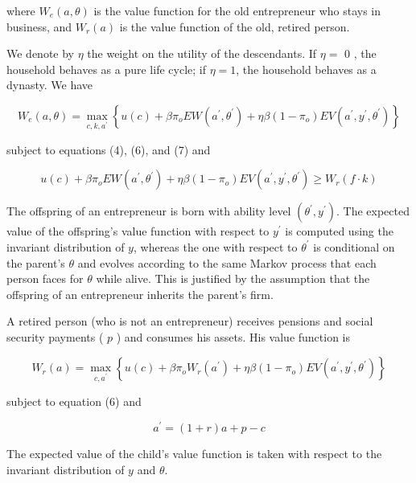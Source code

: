 \documentclass[10pt]{article}
\begin{document}
where $W_{e}(a, \theta)$ is the value function for the old entrepreneur who stays in business, and $W_{r}(a)$ is the value function of the old, retired person.

We denote by $\eta$ the weight on the utility of the descendants. If $\eta=$ 0 , the household behaves as a pure life cycle; if $\eta=1$, the household behaves as a dynasty. We have


\begin{equation*}
W_{e}(a, \theta)=\max _{c, k, a^{\prime}}\left\{u(c)+\beta \pi_{o} E W\left(a^{\prime}, \theta^{\prime}\right)+\eta \beta\left(1-\pi_{o}\right) E V\left(a^{\prime}, y^{\prime}, \theta^{\prime}\right)\right\} \tag{11}
\end{equation*}


subject to equations (4), (6), and (7) and


\begin{equation*}
u(c)+\beta \pi_{o} E W\left(a^{\prime}, \theta^{\prime}\right)+\eta \beta\left(1-\pi_{o}\right) E V\left(a^{\prime}, y^{\prime}, \theta^{\prime}\right) \geq W_{r}(f \cdot k) \tag{12}
\end{equation*}


The offspring of an entrepreneur is born with ability level $\left(\theta^{\prime}, y^{\prime}\right)$. The expected value of the offspring's value function with respect to $y^{\prime}$ is computed using the invariant distribution of $y$, whereas the one with respect to $\theta^{\prime}$ is conditional on the parent's $\theta$ and evolves according to the same Markov process that each person faces for $\theta$ while alive. This is justified by the assumption that the offspring of an entrepreneur inherits the parent's firm.

A retired person (who is not an entrepreneur) receives pensions and social security payments ( $p$ ) and consumes his assets. His value function is


\begin{equation*}
W_{r}(a)=\max _{c, a^{\prime}}\left\{u(c)+\beta \pi_{o} W_{r}\left(a^{\prime}\right)+\eta \beta\left(1-\pi_{o}\right) E V\left(a^{\prime}, y^{\prime}, \theta^{\prime}\right)\right\} \tag{13}
\end{equation*}


subject to equation (6) and


\begin{equation*}
a^{\prime}=(1+r) a+p-c \tag{14}
\end{equation*}


The expected value of the child's value function is taken with respect to the invariant distribution of $y$ and $\theta$.
\end{document}
